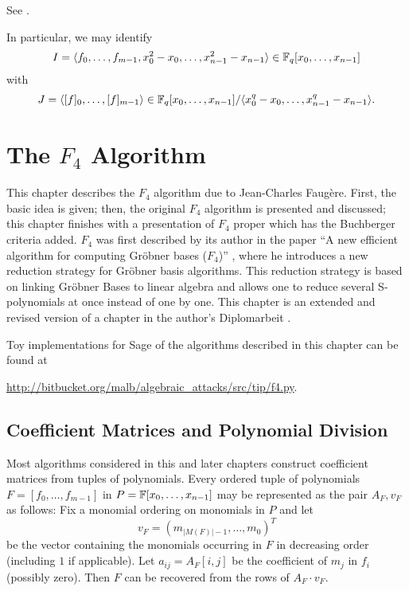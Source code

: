 \begin{citeproof}
See \cite[p.223]{Cox2005}.
\end{citeproof}

In particular, we may identify \[I = \langle {f_0,\dots,f_{m-1},x_0^2 - x_0,\dots,x_{n-1}^2-x_{n-1}} \rangle \in \mathbb{F}_q[x_0,\dots,x_{n-1}]\] with \[J = \langle {[f]_0,\dots,[f]_{m-1}} \rangle \in \mathbb{F}_q[x_0,\dots,x_{n-1}]/\langle {x_0^q - x_0,\dots,x_{n-1}^q-x_{n-1}} \rangle.\]

\chapter{The \texorpdfstring{$F_4$}{F4} Algorithm}
\label{chapter:f4}

This chapter describes the $F_4$ algorithm due to Jean-Charles Faug\`ere. First, the basic idea is given; then, the original $F_{4}$ algorithm is presented and discussed; this chapter finishes with a presentation of $F_4$ proper which has the Buchberger criteria added. $F_4$ was first described by its author in the paper ``A new efficient algorithm for computing Gröbner bases ($F_4$)'' \cite{f4}, where he introduces a new reduction strategy for Gröbner basis algorithms. This reduction strategy is based on linking Gröbner Bases to linear algebra \cite{lazard:eurocal83} and allows one to reduce several S-polynomials at once instead of one by one. This chapter is an extended and revised version of a chapter in the author's Diplomarbeit \cite{Albrecht2007}. 

Toy implementations for Sage of the algorithms described in this chapter can be found at
\begin{center}
\url{http://bitbucket.org/malb/algebraic_attacks/src/tip/f4.py}.
\end{center}

\section{Coefficient Matrices and Polynomial Division}
\label{sec:f4idea}

Most algorithms considered in this and later chapters construct coefficient matrices from tuples of polynomials. Every ordered tuple of polynomials $F = [f_0, \dots, f_{m-1}]$ in $P = \mathbb{F}[x_0,\dots,x_{n-1}]$ may be represented as the pair $A_F,v_F$ as follows: Fix a monomial ordering on monomials in $P$ and let $$v_F = (m_{|M(F)|-1}, \dots, m_0)^T$$ be the vector containing the monomials occurring in $F$ in decreasing order (including $1$ if applicable). Let $a_{ij} = A_F[i,j]$ be the coefficient of $m_j$ in $f_i$ (possibly zero). Then $F$ can be recovered from the rows of $A_F \cdot v_F$.


